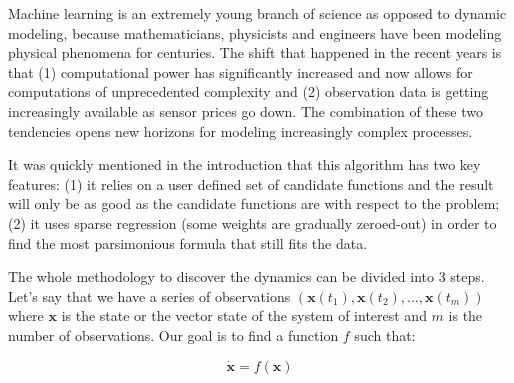 \documentclass[12pt, letterpaper]{article}
\begin{document}
Machine learning is an extremely young branch of science as opposed to dynamic modeling, because mathematicians, physicists and engineers have been modeling physical phenomena for centuries. 
The shift that happened in the recent years is that (1) computational power has significantly increased and now allows for computations of unprecedented complexity and (2) observation data is getting increasingly available as sensor prices go down. 
The combination of these two tendencies opens new horizons for modeling increasingly complex processes.  


It was quickly mentioned in the introduction that this algorithm has two key features: (1) it relies on a user defined set of candidate functions and the result will only be as good as the candidate functions are with respect to the problem; (2) it uses sparse regression (some weights are gradually zeroed-out) in order to find the most parsimonious formula that still fits the data.

The whole methodology to discover the dynamics can be divided into 3 steps. 
Let's say that we have a series of observations $(\mathbf{x}(t_1), \mathbf{x}(t_2), \dots, \mathbf{x}(t_m))$ where $\mathbf{x}$ is the state or the vector state of the system of interest and $m$ is the number of observations. 
Our goal is to find a function $f$ such that:

\begin{equation}\label{eq:diff}
\dot{\mathbf{x}} = f(\mathbf{x})
\end{equation}
\end{document}
